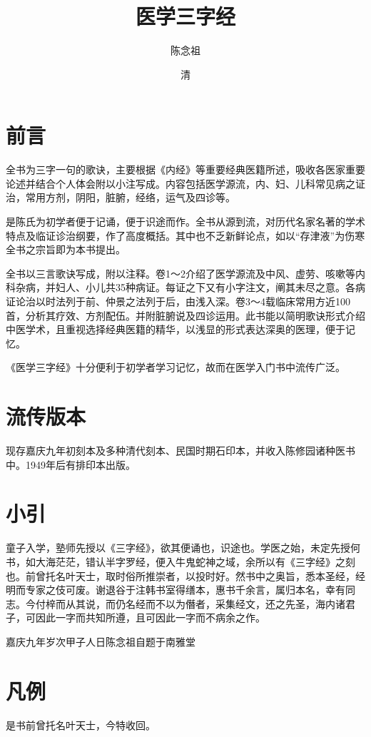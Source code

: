\documentclass[a4paper,12pt,UTF8,twoside]{ctexbook}
\title{\heiti\zihao{0} 医学三字经}
\author{陈念祖}
\date{清}
\begin{document}
	
	\maketitle
	\tableofcontents
	
	\frontmatter

	\chapter{前言}
	全书为三字一句的歌诀，主要根据《内经》等重要经典医籍所述，吸收各医家重要论述并结合个人体会附以小注写成。内容包括医学源流，内、妇、儿科常见病之证治，常用方剂，阴阳，脏腑，经络，运气及四诊等。
	
	是陈氏为初学者便于记诵，便于识途而作。全书从源到流，对历代名家名著的学术特点及临证诊治纲要，作了高度概括。其中也不乏新鲜论点，如以“存津液”为伤寒全书之宗旨即为本书提出。
	
	全书以三言歌诀写成，附以注释。卷1～2介绍了医学源流及中风、虚劳、咳嗽等内科杂病，并妇人、小儿共35种病证。每证之下又有小字注文，阐其未尽之意。各病证论治以时法列于前、仲景之法列于后，由浅入深。卷3～4载临床常用方近100首，分析其疗效、方剂配伍。并附脏腑说及四诊运用。此书能以简明歌诀形式介绍中医学术，且重视选择经典医籍的精华，以浅显的形式表达深奥的医理，便于记忆。

	《医学三字经》十分便利于初学者学习记忆，故而在医学入门书中流传广泛。
	
	\chapter{流传版本}
	现存嘉庆九年初刻本及多种清代刻本、民国时期石印本，并收入陈修园诸种医书中。1949年后有排印本出版。
	
	\chapter{小引}
		
	童子入学，塾师先授以《三字经》，欲其便诵也，识途也。学医之始，未定先授何书，如大海茫茫，错认半字罗经，便入牛鬼蛇神之域，余所以有《三字经》之刻也。前曾托名叶天士，取时俗所推崇者，以投时好。然书中之奥旨，悉本圣经，经明而专家之伎可废。谢退谷于注韩书室得缮本，惠书千余言，属归本名，幸有同志。今付梓而从其说，而仍名经而不以为僭者，采集经文，还之先圣，海内诸君子，可因此一字而共知所遵，且可因此一字而不病余之作。
	
	嘉庆九年岁次甲子人日陈念祖自题于南雅堂
	
	\chapter{凡例}
	是书前曾托名叶天士，今特收回。
	
\end{document}
